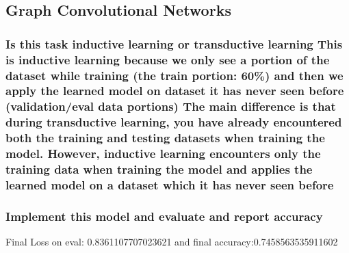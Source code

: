 \documentclass[11pt]{article}
\begin{document}
\subsection{Graph Convolutional Networks}
\subsubsection{Is this task inductive learning or transductive learning
This is inductive learning because we only see a portion of the dataset while training (the train portion: 60\%) and then we apply the learned model on dataset it has never seen before (validation/eval data portions)
The main difference is that during transductive learning, you have already encountered both the training and testing datasets when training the model. However, inductive learning encounters only the training data when training the model and applies the learned model on a dataset which it has never seen before}
\subsubsection{Implement this model and evaluate and report accuracy}
Final Loss on eval: 0.8361107707023621 and final accuracy:0.7458563535911602
\end{document}
